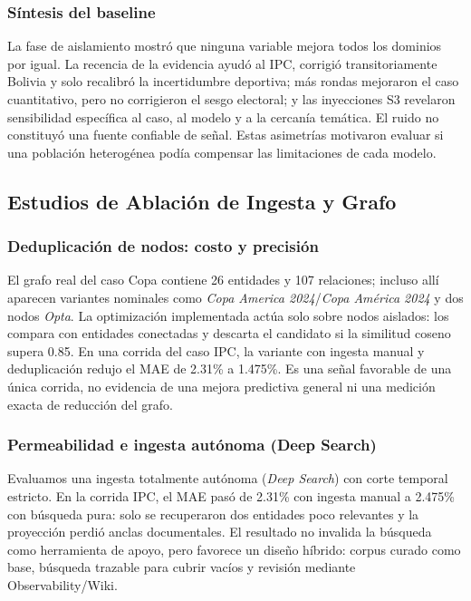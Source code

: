 \documentclass[11pt]{article}
\begin{document}
\subsubsection{Síntesis del baseline}

La fase de aislamiento mostró que ninguna variable mejora todos los dominios por igual. La recencia de la evidencia ayudó al IPC, corrigió transitoriamente Bolivia y solo recalibró la incertidumbre deportiva; más rondas mejoraron el caso cuantitativo, pero no corrigieron el sesgo electoral; y las inyecciones S3 revelaron sensibilidad específica al caso, al modelo y a la cercanía temática. El ruido no constituyó una fuente confiable de señal. Estas asimetrías motivaron evaluar si una población heterogénea podía compensar las limitaciones de cada modelo.

\subsection{Estudios de Ablación de Ingesta y Grafo}

\subsubsection{Deduplicación de nodos: costo y precisión}

El grafo real del caso Copa contiene 26 entidades y 107 relaciones; incluso allí aparecen variantes nominales como \textit{Copa America 2024}/\textit{Copa América 2024} y dos nodos \textit{Opta}. La optimización implementada actúa solo sobre nodos aislados: los compara con entidades conectadas y descarta el candidato si la similitud coseno supera 0.85. En una corrida del caso IPC, la variante con ingesta manual y deduplicación redujo el MAE de 2.31\% a 1.475\%. Es una señal favorable de una única corrida, no evidencia de una mejora predictiva general ni una medición exacta de reducción del grafo.


\subsubsection{Permeabilidad e ingesta autónoma (Deep Search)}

Evaluamos una ingesta totalmente autónoma (\textit{Deep Search}) con corte temporal estricto. En la corrida IPC, el MAE pasó de 2.31\% con ingesta manual a 2.475\% con búsqueda pura: solo se recuperaron dos entidades poco relevantes y la proyección perdió anclas documentales. El resultado no invalida la búsqueda como herramienta de apoyo, pero favorece un diseño híbrido: corpus curado como base, búsqueda trazable para cubrir vacíos y revisión mediante Observability/Wiki.
\end{document}
